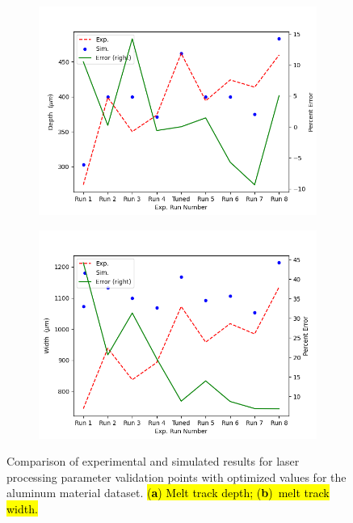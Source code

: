 \documentclass[metals,article,accept,pdftex,moreauthors]{Definitions/mdpi}
\begin{document}
\vspace{-12pt}
\begin{figure}[H]
	\begin{subfigure}[c]{0.45\textwidth}
	\includegraphics[width=\textwidth]{melt_track_val_depth}
	\caption{\centering}
	\label{fig:melt_track_val_depth}
	\end{subfigure}
		\begin{subfigure}[c]{0.45\textwidth}
		\includegraphics[width=\textwidth]{melt_track_val_width}
		\caption{\centering}
		\label{fig:melt_track_val_width}
		\end{subfigure}
	\caption{Comparison of experimental and simulated results for laser processing 
	parameter validation points with optimized values for the aluminum material dataset. 
	\hl{(\textbf{a}) Melt track depth; (\textbf{b})~melt track width.}}
	\label{fig:melt_track_val}
\end{figure}
\end{document}
